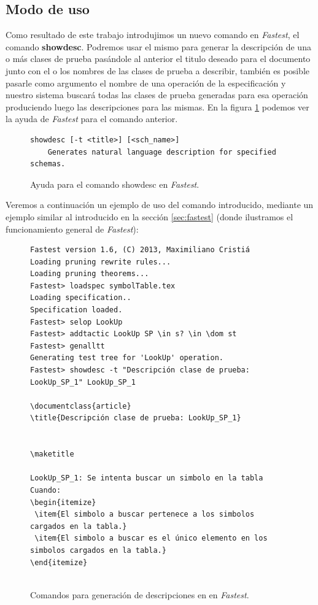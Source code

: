 \subsection{Modo de uso}

Como resultado de este trabajo introdujimos un nuevo comando en \textit{Fastest}, el comando \textbf{showdesc}. Podremos usar el mismo para generar la descripción de una o más clases de prueba pasándole al anterior el titulo deseado para el documento junto con el o los nombres de las clases de prueba a describir, también es posible pasarle como argumento el nombre de una operación de la especificación y nuestro sistema buscará todas las clases de prueba generadas para esa operación produciendo luego las descripciones para las mismas. En la figura \ref{ej:showdesc_fastest} podemos ver la ayuda de \textit{Fastest} para el comando anterior.

\begin{figure}[H]
\begin{Verbatim}[frame=single,fontsize=\scriptsize]
showdesc [-t <title>] [<sch_name>]
	Generates natural language description for specified schemas.
\end{Verbatim}
\caption{Ayuda para el comando showdesc en \emph{Fastest}.}
\label{ej:showdesc_fastest}
\end{figure}

Veremos a continuación un ejemplo de uso del comando introducido, mediante un ejemplo similar al introducido en la sección \ref{sec:fastest} (donde ilustramos el funcionamiento general de \textit{Fastest}):

\begin{figure}[H]
\begin{Verbatim}[frame=single,fontsize=\scriptsize]
Fastest version 1.6, (C) 2013, Maximiliano Cristiá
Loading pruning rewrite rules...
Loading pruning theorems...
Fastest> loadspec symbolTable.tex
Loading specification..
Specification loaded.
Fastest> selop LookUp
Fastest> addtactic LookUp SP \in s? \in \dom st      
Fastest> genalltt
Generating test tree for 'LookUp' operation.
Fastest> showdesc -t "Descripción clase de prueba: LookUp_SP_1" LookUp_SP_1 

\documentclass{article}
\title{Descripción clase de prueba: LookUp_SP_1}


\maketitle

LookUp_SP_1: Se intenta buscar un simbolo en la tabla
Cuando:
\begin{itemize}
 \item{El simbolo a buscar pertenece a los simbolos cargados en la tabla.}
 \item{El simbolo a buscar es el único elemento en los simbolos cargados en la tabla.}
\end{itemize}


\end{Verbatim}
\caption{Comandos para generación de descripciones en en \emph{Fastest}.}
\label{ej:comandos_fastest_nlg}
\end{figure}

